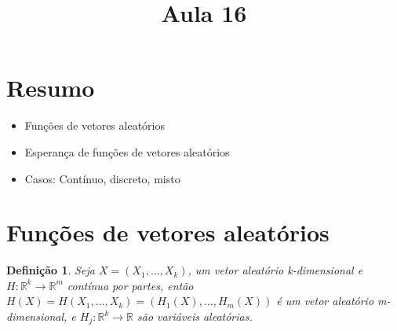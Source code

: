 \documentclass[12pt, letterpaper]{article}
\title{Aula 16}
\date{}
\newtheorem{definition}{Definição}
\theoremstyle{definition}
\begin{document}
\maketitle

\section*{Resumo}

\begin{itemize}
  \item Funções de vetores aleatórios
  \item Esperança de funções de vetores aleatórios
  \item Casos: Contínuo, discreto, misto
\end{itemize}

\section{Funções de vetores aleatórios}


  \begin{definition}
    Seja \(X = (X_1, \dots, X_{k})\), um vetor aleatório k-dimensional e
    \(H\colon \mathbb{R}^{k}\to \mathbb{R}^{m}\) contínua por partes,
    então \(H(X) = H(X_{1}, \dots, X_{k}) = (H_{1}(X), \dots, H_{m}(X))\) é um vetor aleatório m-dimensional, e \(H_{j}\colon \mathbb{R}^{k}\to \mathbb{R}\) são variáveis aleatórias.
  \end{definition}
\end{document}
